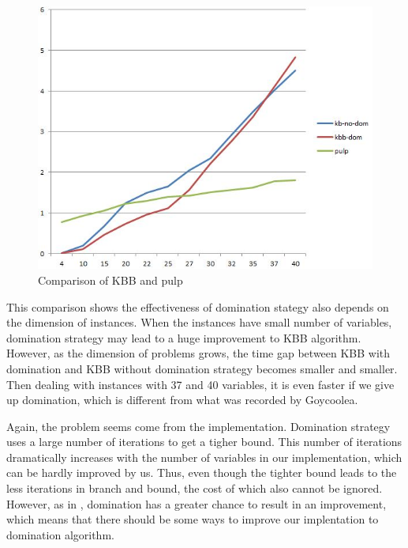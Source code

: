 \documentclass[a4paper,11pt]{article}
\begin{document}
\begin{figure}[H]
\begin{center}
\includegraphics[scale=0.6]{2}
\end{center}
\caption{Comparison of KBB and pulp \label{f3}}
\end{figure}

This comparison shows the effectiveness of domination stategy also depends on the dimension of instances. When the instances have small number of variables, domination strategy may lead to a huge improvement to KBB algorithm. However, as the dimension of problems grows, the time gap between KBB with domination and KBB without domination strategy becomes smaller and smaller. Then dealing with instances with 37 and 40 variables, it is even faster if we give up domination, which is different from what was recorded by Goycoolea.

Again, the problem seems come from the implementation. Domination strategy uses a large number of iterations to get a tigher bound. This number of iterations dramatically increases with the number of variables in our implementation, which can be hardly improved by us. Thus, even though the tighter bound leads to the less iterations in branch and bound, the cost of which also cannot be ignored. However, as in \cite{fukasawa2011exact}, domination has a greater chance to result in an improvement, which means that there should be some ways to improve our implentation to domination algorithm.
\end{document}
